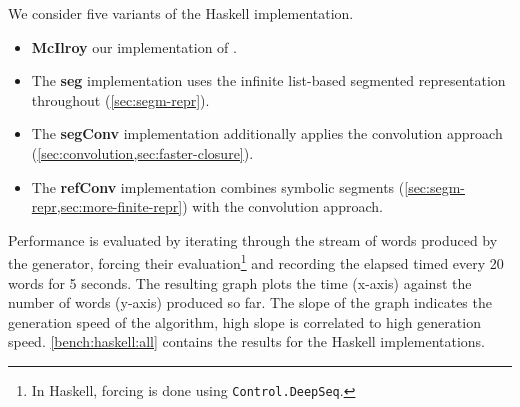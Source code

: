 We consider five variants of the Haskell implementation.
\begin{itemize}
\item \textbf{McIlroy} our implementation of \citet{DBLP:journals/jfp/McIlroy99}. 
\item The \textbf{seg} implementation uses the infinite list-based segmented
  representation throughout (\cref{sec:segm-repr}).
\item The \textbf{segConv} implementation additionally
  applies the convolution approach (\cref{sec:convolution,sec:faster-closure}).
\item The \textbf{refConv} implementation combines
   symbolic segments (\cref{sec:segm-repr,sec:more-finite-repr}) with the convolution approach.
\end{itemize}

Performance is evaluated by iterating through the stream of words
produced by the generator, forcing their evaluation\footnote{In
  Haskell, forcing is done using \lstinline{Control.DeepSeq}.}
and recording the elapsed timed every 20 words for 5 seconds.
The resulting graph plots the time (x-axis) against the number of words (y-axis) produced so far. The slope of the graph indicates the generation speed of the algorithm, high slope is correlated to high generation speed.  \cref{bench:haskell:all} contains the results for the Haskell implementations.
 
